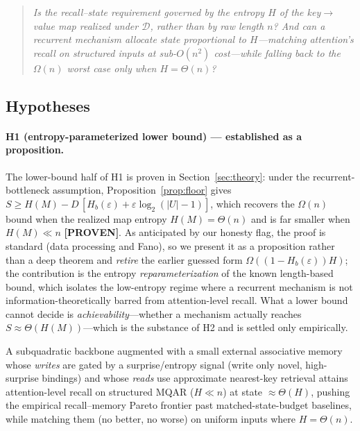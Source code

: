 \begin{quote}
\emph{Is the recall--state requirement governed by the entropy $H$ of the
key$\rightarrow$value map realized under $\mathcal{D}$, rather than by raw length $n$? And can a
recurrent mechanism allocate state proportional to $H$---matching attention's recall on
structured inputs at sub-$O(n^2)$ cost---while falling back to the $\Omega(n)$ worst case only
when $H = \Theta(n)$?}
\end{quote}

\subsection{Hypotheses}

\paragraph{H1 (entropy-parameterized lower bound) --- established as a proposition.}
The lower-bound half of H1 is proven in Section~\ref{sec:theory}: under the recurrent-bottleneck
assumption, Proposition~\ref{prop:floor} gives
$S \ge H(M) - D\,[H_b(\varepsilon) + \varepsilon \log_2(|U|-1)]$, which recovers the $\Omega(n)$
bound when the realized map entropy $H(M) = \Theta(n)$ and is far smaller when $H(M) \ll n$
\textbf{[PROVEN]}. As anticipated by our honesty flag, the proof is standard (data processing and
Fano), so we present it as a proposition rather than a deep theorem and \emph{retire} the earlier
guessed form $\Omega((1 - H_b(\varepsilon))H)$; the contribution is the entropy
\emph{reparameterization} of the known length-based bound, which isolates the low-entropy regime
where a recurrent mechanism is not information-theoretically barred from attention-level recall.
What a lower bound cannot decide is \emph{achievability}---whether a mechanism actually reaches
$S \approx \Theta(H(M))$---which is the substance of H2 and is settled only empirically.

\begin{conjecture}
A subquadratic backbone augmented with a small external associative memory whose \emph{writes}
are gated by a surprise/entropy signal (write only novel, high-surprise bindings) and whose
\emph{reads} use approximate nearest-key retrieval attains attention-level recall on structured
MQAR ($H \ll n$) at state $\approx \Theta(H)$, pushing the empirical recall--memory Pareto
frontier past matched-state-budget baselines, while matching them (no better, no worse) on
uniform inputs where $H = \Theta(n)$.
\end{conjecture}

